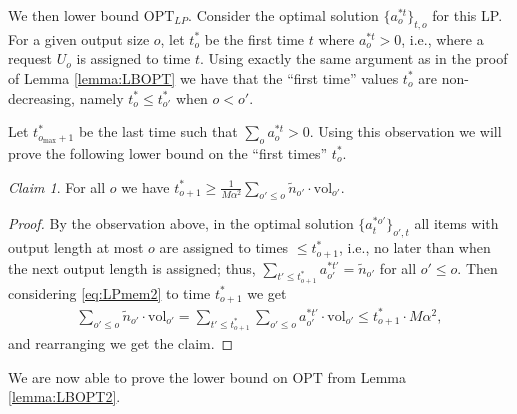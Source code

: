 \documentclass[11pt, a4paper]{article}
\theoremstyle{plain}
\theoremstyle{definition}
\theoremstyle{remark}
\newcommand{\OPT}{\text{OPT}}
\newtheorem{claim}[theorem]{Claim}
\newcommand{\vol}{\textrm{vol}}
\begin{document}
We then lower bound $\OPT_{LP}$. Consider the optimal solution $\{a^{* t}_o\}_{t,o}$ for this LP. For a given output size $o$, let $t^*_o$ be the first time $t$ where $a^{* t}_o > 0$, i.e., where a request $U_o$ is assigned to time $t$. Using exactly the same argument as in the proof of Lemma \ref{lemma:LBOPT} we have that the ``first time'' values $t^*_o$ are non-decreasing, namely $t^*_o \le t^*_{o'}$ when $o < o'$. 

Let $t^*_{o_{\max} + 1}$ be the last time such that $\sum_o a^{* t}_o > 0$. Using this observation we will prove the following lower bound on the ``first times'' $t^*_o$.



\begin{claim}	\label{claim:tStar}
	For all $o$ we have $t^*_{o + 1} \ge \frac{1}{M\alpha^2} \sum_{o' \le o} \tilde{n}_{o'} \cdot \vol_{o'}$. 
\end{claim}

\begin{proof}
	By the observation above, in the optimal solution $\{a^{*o'}_t\}_{o',t}$ all items with output length at most $o$ are assigned to times $\le t^*_{o + 1}$, i.e., no later than when the next output length is assigned; thus, $\sum_{t' \le t^*_{o + 1}} a^{*t'}_{o'} = \tilde{n}_{o'}$ for all $o' \le o$. Then considering \eqref{eq:LPmem2} to time $t^*_{o + 1}$ we get
	\begin{align*}
		\sum_{o' \le o} \tilde{n}_{o'} \cdot \vol_{o'} = \sum_{t' \le t^*_{o + 1}} \sum_{o' \le o} a^{*t'}_{o'} \cdot \vol_{o'} \le t^*_{o + 1} \cdot M\alpha^2,
	\end{align*}
	and rearranging we get the claim. 
\end{proof}

We are now able to prove the lower bound on $\OPT$ from Lemma \ref{lemma:LBOPT2}.
\end{document}
